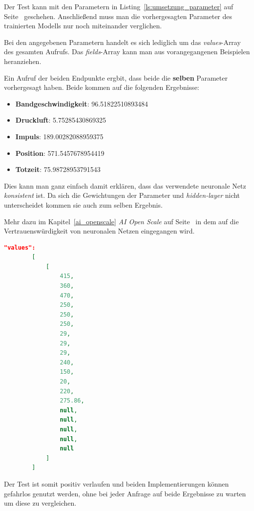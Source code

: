 Der Test kann mit den Parametern in Listing~\ref{ls:umsetzung_parameter} auf Seite~\pageref{ls:umsetzung_parameter} 
geschehen. Anschließend muss man die vorhergesagten Parameter des trainierten Modells nur noch miteinander verglichen.

Bei den angegebenen Parametern handelt es sich lediglich um das \textit{values}-Array des gesamten Aufrufs. Das 
\textit{fields}-Array kann man aus vorangegangenen Beispielen heranziehen.

Ein Aufruf der beiden Endpunkte ergbit, dass beide die \textbf{selben} Parameter vorhergesagt haben. Beide kommen auf 
die folgenden Ergebnisse:

\begin{itemize}
    \item \textbf{Bandgeschwindigkeit}: 96.51822510893484
    \item \textbf{Druckluft}: 5.75285430869325
    \item \textbf{Impuls}: 189.00282088959375
    \item \textbf{Position}: 571.5457678954419
    \item \textbf{Totzeit}: 75.98728953791543
\end{itemize}

Dies kann man ganz einfach damit erklären, dass das verwendete neuronale Netz \textit{konsistent} ist. Da sich die 
Gewichtungen der Parameter und \textit{hidden-layer} nicht unterscheidet kommen sie auch zum selben Ergebnis. 

Mehr dazu im Kapitel~\ref{ai_openscale} \textit{AI Open Scale} auf Seite~\pageref{ai_openscale} in dem auf die 
Vertrauenswürdigkeit von neuronalen Netzen eingegangen wird.

\begin{lstlisting}[language=JSON, caption=Parameter zum Test der beiden Implementierungen, label=ls:umsetzung_parameter]
    "values":
        [
            [
                415,
                360,
                470,
                250,
                250,
                250,
                29,
                29,
                29,
                240,
                150,
                20,
                220,
                275.86,
                null,
                null,
                null,
                null,
                null
            ]
        ]
\end{lstlisting}

Der Test ist somit positiv verlaufen und beiden Implementierungen können gefahrlos genutzt werden, ohne bei jeder Anfrage
auf beide Ergebnisse zu warten um diese zu vergleichen.